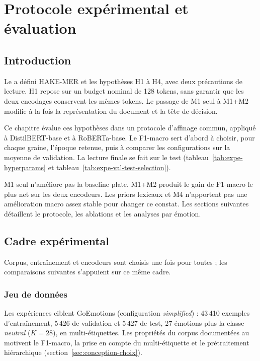 \chapter{Protocole expérimental et évaluation}

\section*{Introduction}
Le  a défini HAKE-MER et les hypothèses H1 à H4, avec
deux précautions de lecture. H1 repose sur un budget nominal de 128
tokens, sans garantir que les deux encodages conservent les mêmes
tokens. Le passage de M1 seul à M1+M2 modifie à la fois la représentation
du document et la tête de décision.

Ce chapitre évalue ces hypothèses dans un protocole d'affinage commun,
appliqué à DistilBERT-base et à RoBERTa-base. Le F1-macro sert d'abord à
choisir, pour chaque graine, l'époque retenue, puis à comparer les
configurations sur la moyenne de validation. La lecture finale se fait
sur le test (tableau~\ref{tab:expe-hyperparams} et
tableau~\ref{tab:expe-val-test-selection}).

M1 seul n'améliore pas la baseline plate. M1+M2 produit le gain de
F1-macro le plus net sur les deux encodeurs. Les priors lexicaux et M4
n'apportent pas une amélioration macro assez stable pour changer ce
constat. Les sections suivantes détaillent le protocole, les ablations
et les analyses par émotion.

\section{Cadre expérimental}
\label{sec:expe-cadre}

Corpus, entraînement et encodeurs sont choisis une fois pour toutes ;
les comparaisons suivantes s'appuient sur ce même cadre.

\subsection{Jeu de données}

Les expériences ciblent GoEmotions (configuration \emph{simplified})
\cite{demszky2020} : 43\,410 exemples d'entraînement, 5\,426 de
validation et 5\,427 de test, 27 émotions plus la classe \emph{neutral}
($K{=}28$), en multi-étiquettes. Les propriétés du corpus documentées
au  motivent le F1-macro, la prise en compte
du multi-étiquette et le prétraitement hiérarchique
(section~\ref{sec:conception-choix}).


